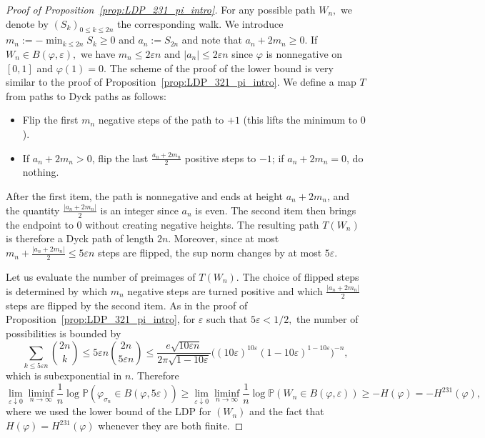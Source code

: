 \documentclass[a4paper,11pt]{amsart}
\newcommand{\eps}{\varepsilon}
\theoremstyle{definition}
\begin{document}
\begin{proof}[Proof of Proposition~\ref{prop:LDP_231_pi_intro}]
    For any possible path $W_n,$ we denote by $(S_k)_{0 \le k \le 2n}$ the corresponding walk. We introduce
    $m_n := -\min_{k \le 2n} S_k \ge 0$ and $a_n := S_{2n}$ and note that $a_n+2m_n \ge 0$.
    If $W_n \in B(\varphi,\varepsilon),$ we have $m_n \le 2\eps n$ and $|a_n| \le 2\eps n$ since $\varphi$ is nonnegative on $[0,1]$ and $\varphi(1) = 0.$
	The scheme of the proof of the lower bound is very similar to the proof of Proposition~\ref{prop:LDP_321_pi_intro}. We define a map $T$ from paths to Dyck paths as follows:
    \begin{itemize}
        \item Flip the first $m_n$ negative steps of the path to $+1$ (this lifts the minimum to $0$).
        \item If $a_n+2m_n>0$, flip the last $\frac{a_n+2m_n}{2}$ positive steps to $-1$; 
        if $a_n+2m_n=0$, do nothing.
    \end{itemize}
    After the first item, the path is nonnegative and ends at height $a_n+2m_n$, and the quantity $\frac{|a_n+2m_n|}{2}$ is an integer since $a_n$ is even.
    The second item then brings the endpoint to $0$ without creating negative heights.
    The resulting path $T(W_n)$ is therefore a Dyck path of length $2n$.
    Moreover, since at most $m_n+\frac{|a_n+2m_n|}{2} \le 5\eps n$ steps are flipped, the sup norm changes by at most $5\eps.$


Let us evaluate the number of preimages of $T(W_n).$ The choice of flipped steps is determined by which $m_n$ negative steps are turned positive and which $\frac{|a_n+2m_n|}{2}$ steps are flipped by the second item.
    As in the proof of Proposition~\ref{prop:LDP_321_pi_intro},  for $\varepsilon$ such  that $5\varepsilon<1/2,$ the number of possibilities is bounded by
    \[
        \sum_{k \le 5\eps n} \binom{2n}{k} \le 5\eps n \binom{2n}{5\eps n}
        \le \frac{ e \sqrt{10\eps n}}{2\pi \sqrt{1-10\eps}} \big( (10\eps)^{10\eps} (1-10\eps)^{1-10\eps} \big)^{-n},
    \]
    which is subexponential in $n$.
    Therefore
\[    \lim_{\varepsilon \downarrow 0} \liminf_{n \rightarrow\infty} 
\frac1n \log
\mathbb P(\varphi_{\sigma_n} \in B(\varphi , 5\varepsilon )) \ge
    \lim_{\varepsilon \downarrow 0} \liminf_{n \rightarrow\infty} 
    \frac1n \log
    \mathbb P(W_n \in B(\varphi , \varepsilon )) \ge - H(\varphi) = - H^{231}(\varphi),\]
   where we used the lower bound of the LDP for $(W_n)$ and the fact that $H(\varphi) = H^{231}(\varphi)$ whenever they are both finite.
\end{proof}
\end{document}
